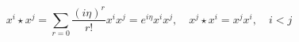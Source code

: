 \begin{equation}
x^{i}\star x^{j}=\sum_{r=0}\frac{\left( i\eta \right) ^{r}}{r!}%
x^{i}x^{j}=e^{i\eta }x^{i}x^{j},\quad x^{j}\star x^{i}=x^{j}x^{i},\quad
i<j\quad  
\end{equation}

